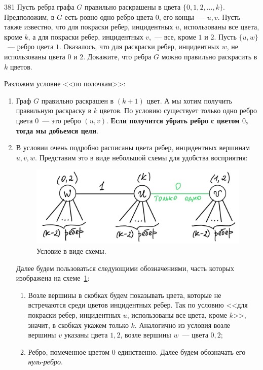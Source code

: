 \begin{task}{381}
Пусть ребра графа \(G\) правильно раскрашены в цвета \(\{0,1,2,\ldots,k\}\). Предположим, в \(G\) есть ровно одно ребро цвета \(0\), его концы~--- \(u,v\). Пусть также известно, что для покраски ребер, инцидентных \(u\), использованы все цвета, кроме \(k\), а для покраски ребер, инцидентных \(v\),~--- все, кроме \(1\) и \(2\). Пусть \(\{u,w\}\)~--- ребро цвета \(1\). Оказалось, что для раскраски ребер, инцидентных \(w\), не использованы цвета \(0\) и \(2\). Докажите, что ребра \(G\) можно правильно раскрасить в \(k\) цветов.  
\end{task}

Разложим условие <<по полочкам>>:
\begin{enumerate}
    \item Граф \(G\) правильно раскрашен в \((k + 1)\) цвет. А мы хотим получить правильную раскраску в \(k\) цветов. По условию существует только одно ребро цвета \(0\)~--- это ребро \((u, v)\). \textbf{Если получится убрать ребро с цветом \(0\), тогда мы добьемся цели}.
    
    \item В условии очень подробно расписаны цвета ребер, инцидентных вершинам \(u, v, w\). Представим это в виде небольшой схемы для удобства восприятия:
    \begin{figure}[H]
        \centering
        \includegraphics[scale=0.3]{Fall/img/solution-381_scheme.jpg}
        \caption{Условие в виде схемы.} \label{scheme 381}
    \end{figure}
    
    Далее будем пользоваться следующими обозначениями, часть которых изображена на схеме~\ref{scheme 381}:
    \begin{enumerate}
        \item Возле вершины в скобках будем показывать цвета, которые не встречаются среди цветов инцидентных ребер. Так по условию <<для покраски ребер, инцидентных \(u\), использованы все цвета, кроме \(k\)>>, значит, в скобках укажем только \(k\). Аналогично из условия возле вершины \(v\) указаны цвета \(1, 2\), возле вершины \(w\)~--- цвета \(0, 2\);
        
        \item Ребро, помеченное цветом \(0\) единственно. Далее будем обозначать его \emph{нуль-ребро}.
    \end{enumerate}
\end{enumerate}

